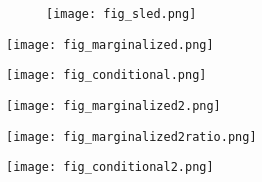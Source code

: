 \documentclass[12pt]{article}
\begin{document}
\begin{figure}
\texttt{[image: fig\_sled.png]}
\end{figure}
\begin{figure*}
\texttt{[image: fig\_marginalized.png]}
\end{figure*}

\clearpage


\begin{figure*}
\texttt{[image: fig\_conditional.png]}
\end{figure*}

\clearpage

\begin{figure*}
\texttt{[image: fig\_marginalized2.png]}
\end{figure*}

\begin{figure*}
\texttt{[image: fig\_marginalized2ratio.png]}
\end{figure*}

\begin{figure*}
\texttt{[image: fig\_conditional2.png]}
\end{figure*}
\end{document}
